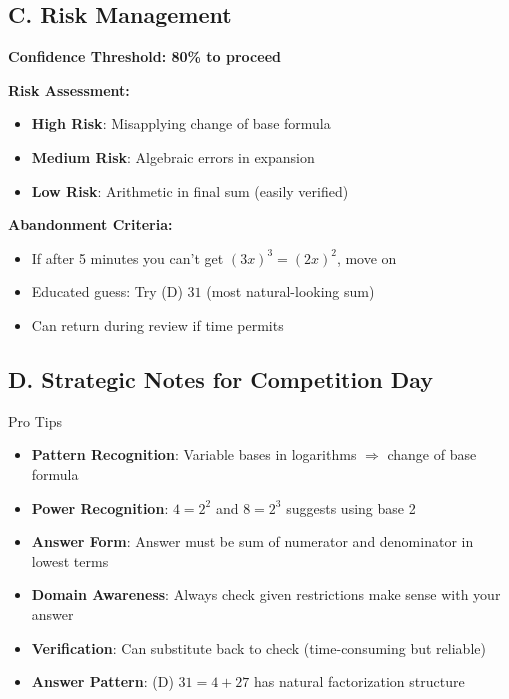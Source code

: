 \documentclass[12pt]{article}
\begin{document}
\begin{competitionbox}
\subsection*{C. Risk Management}

\textbf{Confidence Threshold: 80\% to proceed}

\textbf{Risk Assessment:}
\begin{itemize}
    \item \textbf{High Risk}: Misapplying change of base formula
    \item \textbf{Medium Risk}: Algebraic errors in expansion
    \item \textbf{Low Risk}: Arithmetic in final sum (easily verified)
\end{itemize}

\textbf{Abandonment Criteria:}
\begin{itemize}
    \item If after 5 minutes you can't get $(3x)^3 = (2x)^2$, move on
    \item Educated guess: Try (D) $31$ (most natural-looking sum)
    \item Can return during review if time permits
\end{itemize}

\subsection*{D. Strategic Notes for Competition Day}

\begin{highlightbox}{Pro Tips}
\begin{itemize}
    \item \textbf{Pattern Recognition}: Variable bases in logarithms $\Rightarrow$ change of base formula
    \item \textbf{Power Recognition}: $4 = 2^2$ and $8 = 2^3$ suggests using base 2
    \item \textbf{Answer Form}: Answer must be sum of numerator and denominator in lowest terms
    \item \textbf{Domain Awareness}: Always check given restrictions make sense with your answer
    \item \textbf{Verification}: Can substitute back to check (time-consuming but reliable)
    \item \textbf{Answer Pattern}: (D) $31 = 4 + 27$ has natural factorization structure
\end{itemize}
\end{highlightbox}


\end{competitionbox}
\end{document}
